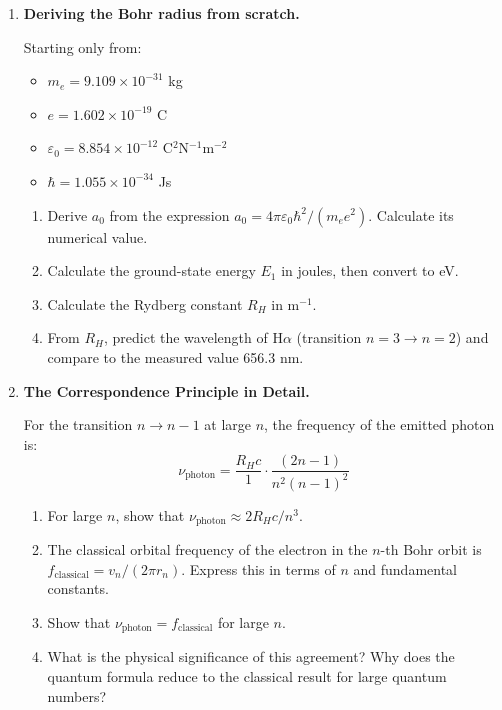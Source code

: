 \documentclass[12pt, a4paper]{book}
\begin{document}
\begin{deepbox}
\begin{enumerate}[label=\textbf{D\arabic*.}]

  \item \textbf{Deriving the Bohr radius from scratch.}

        Starting only from:
        \begin{itemize}[nosep]
          \item $m_e = 9.109\times10^{-31}$ kg
          \item $e = 1.602\times10^{-19}$ C
          \item $\varepsilon_0 = 8.854\times10^{-12}$ C$^2$N$^{-1}$m$^{-2}$
          \item $\hbar = 1.055\times10^{-34}$ Js
        \end{itemize}
        \begin{enumerate}[label=(\alph*)]
          \item Derive $a_0$ from the expression
                $a_0 = 4\pi\varepsilon_0\hbar^2/(m_e e^2)$.
                Calculate its numerical value.
          \item Calculate the ground-state energy $E_1$
                in joules, then convert to eV.
          \item Calculate the Rydberg constant $R_H$ in m$^{-1}$.
          \item From $R_H$, predict the wavelength of H$\alpha$
                (transition $n=3\to n=2$) and compare to the
                measured value 656.3 nm.
        \end{enumerate}

  \item \textbf{The Correspondence Principle in Detail.}

        For the transition $n \to n-1$ at large $n$,
        the frequency of the emitted photon is:
        \[
          \nu_\text{photon} = \frac{R_H c}{1} \cdot
          \frac{(2n-1)}{n^2(n-1)^2}
        \]
        \begin{enumerate}[label=(\alph*)]
          \item For large $n$, show that
                $\nu_\text{photon} \approx 2R_H c / n^3$.
          \item The classical orbital frequency of the electron
                in the $n$-th Bohr orbit is
                $f_\text{classical} = v_n/(2\pi r_n)$.
                Express this in terms of $n$ and fundamental constants.
          \item Show that $\nu_\text{photon} = f_\text{classical}$
                for large $n$.
          \item What is the physical significance of this agreement?
                Why does the quantum formula reduce to the
                classical result for large quantum numbers?
        \end{enumerate}


\end{enumerate}
\end{deepbox}
\end{document}
